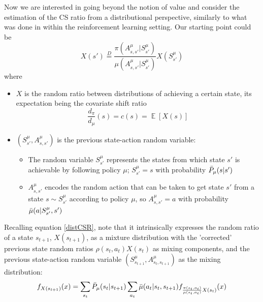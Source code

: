 \documentclass[12pt,a4paper,openright,twoside]{article}
\DeclareMathOperator*{\E}{\mathbb{E}}
\numberwithin{equation}{section}
\theoremstyle{definition}
\theoremstyle{remark}
\theoremstyle{plain}
\begin{document}
Now we are interested in going beyond the notion of value and consider the estimation of the CS ratio from a distributional perspective, similarly to what was done in \cite{DRL} within the reinforcement learning setting. Our starting point could be 
\begin{equation} \label{distCSR}
    X(s') \stackrel{D}{=} \frac{\pi(A^\mu_{s,s'}|S^\mu_{s'})}{\mu(A^\mu_{s,s'}|S^\mu_{s'})} X(S^\mu_{s'}) 
\end{equation}
where
\begin{itemize}
    \item $X$ is the random ratio between distributions of achieving a certain state, its expectation being the covariate shift ratio 
    \begin{equation}
        \frac{d_\pi}{d_\mu}(s) = c(s) = \E [X(s)]
    \end{equation}
    
    \item $(S^\mu_{s'},A^\mu_{s,s'} )$ is the previous state-action random variable:
   	\begin{itemize}
    	\item The random variable $S^\mu_{s'}$ represents the states from which state $s'$ is achievable by following policy $\mu$; $S^\mu_{s'} =s$ with probability $\Bar{P}_\mu(s|s')$
   	 	\item $A^\mu_{s,s'}$ encodes the random action that can be taken to get state $s'$ from a state $s\sim S^\mu_{s'}$ according to policy $\mu$, so $A^\mu_{s,s'} =a$ with probability $\Bar{\mu}(a|S^\mu_{s'},s')$
   	 \end{itemize}
 
\end{itemize}

Recalling equation \ref{distCSR}, note that it intrinsically expresses the random ratio of a state $s_{t+1}$, $X(s_{t+1})$, as a mixture distribution with the 'corrected' previous state random ratios $\rho(s_{t},a_{t}) X(s_{t})$ as mixing components, and the previous state-action random variable $(S^\mu_{s_{t+1}},A^\mu_{s_{t},s_{t+1}} )$ as the mixing distribution:
\begin{equation} \label{densityDCS}
    f_{X(s_{t+1})}(x) = \sum_{s_{t}} \Bar{P}_\mu (s_{t} | s_{t+1}) \sum_{a_t} \Bar{\mu}(a_t|s_{t},s_{t+1}) f_{\frac{\pi(s_{t},a_{t})}{\mu(s_{t},a_{t})} X(s_{t})}(x) 
\end{equation}
\end{document}
